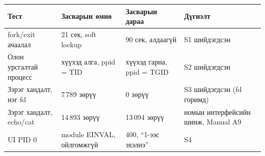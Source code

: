 \documentclass[11pt,a4paper]{article}
\begin{document}
\begin{center}\small
\begin{tabular}{L{4.6cm} L{3.6cm} L{3.6cm} L{3.6cm}}
\toprule
\textbf{Тест} & \textbf{Засварын өмнө} & \textbf{Засварын дараа} & \textbf{Дүгнэлт}\\
\midrule
fork/exit ачаалал & 21 сек, soft lockup & 90 сек, алдаагүй & S1 шийдэгдсэн\\
Олон урсгалтай процесс & хүүхэд алга, ppid = TID & хүүхэд гарна, ppid = TGID & S2 шийдэгдсэн\\
Зэрэг хандалт, нэг fd & 7\,789 зөрүү & 0 зөрүү & S3 шийдэгдсэн (fd горимд)\\
Зэрэг хандалт, echo/cat & 14\,893 зөрүү & 13\,094 зөрүү & номын интерфейсийн шинж, Manual A9\\
UI PID 0 & module EINVAL, ойлгомжгүй & 400, ``1-ээс эхэлнэ'' & S4\\
\bottomrule
\end{tabular}
\end{center}
\end{document}
